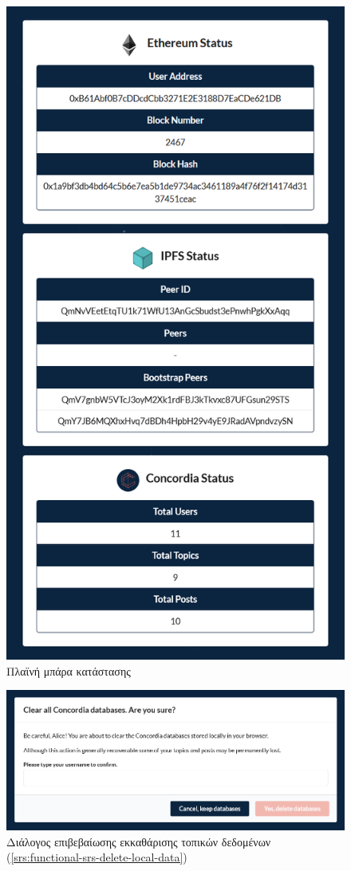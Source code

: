 \begin{figure}[H]
	\centering
	\includegraphics[width=.75\textwidth]{assets/figures/appendix-a/screenshot-10-status-sidebar}
	\caption{Πλαϊνή μπάρα κατάστασης}
\end{figure}

\begin{figure}[H]
	\centering
	\includegraphics[width=\textwidth]{assets/figures/appendix-a/screenshot-11-clear-databases-dialog}
	\caption{Διάλογος επιβεβαίωσης εκκαθάρισης τοπικών δεδομένων  (\ref{srs:functional-srs-delete-local-data})}
\end{figure}


